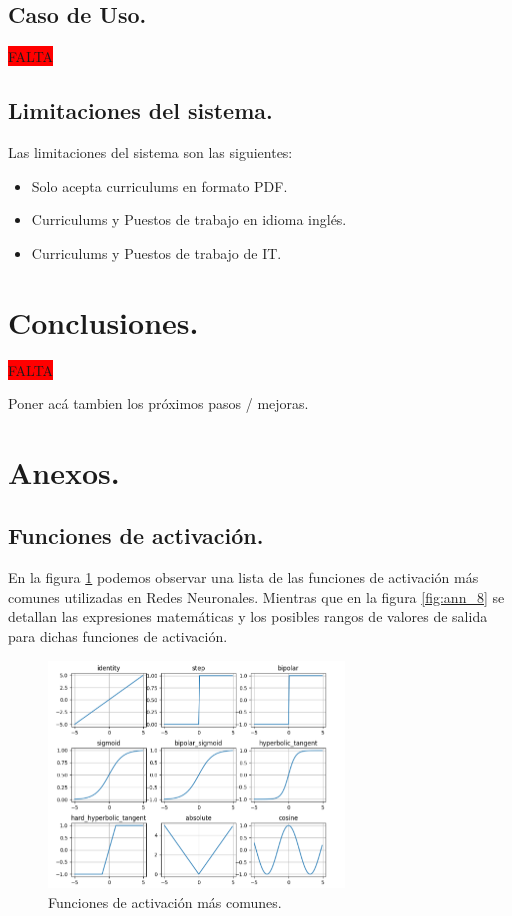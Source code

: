 \documentclass[12pt,a4paper]{article}
\begin{document}
\begin{sloppypar}
\cleardoublepage

\subsection{Caso de Uso.}
\colorbox{red}{FALTA}
\cleardoublepage

\subsection{Limitaciones del sistema.}
Las limitaciones del sistema son las siguientes:
\begin{itemize}
\item Solo acepta curriculums en formato PDF.
\item Curriculums y Puestos de trabajo en idioma inglés. 
\item Curriculums y Puestos de trabajo de IT. 
\end{itemize}

\cleardoublepage

\section{Conclusiones.}
\colorbox{red}{FALTA}

Poner acá tambien los próximos pasos / mejoras.
\cleardoublepage

\section{Anexos.}

\subsection{Funciones de activación.}\label{anexo_func_activ}

En la figura \ref{fig:ann_7} podemos observar una lista de las funciones de activación más comunes utilizadas en Redes Neuronales. Mientras que en la figura \ref{fig:ann_8} se detallan las expresiones matemáticas y los posibles rangos de valores de salida para dichas funciones de activación. 

\begin{figure}[H]    %
 \centering
 \includegraphics[width=0.7\textwidth]{images/ANN/7-ANN.png}
 \caption{Funciones de activación más comunes\cite{ANN_22}.} 
 \label{fig:ann_7}
\end{figure}


\end{sloppypar}
\end{document}
